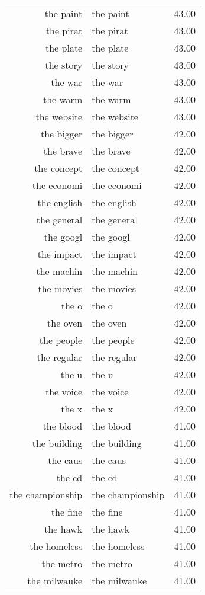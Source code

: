 \begin{table}[ht]
\begin{tabular}{rlr}
  the paint & the paint & 43.00 \\ 
  the pirat & the pirat & 43.00 \\ 
  the plate & the plate & 43.00 \\ 
  the story & the story & 43.00 \\ 
  the war & the war & 43.00 \\ 
  the warm & the warm & 43.00 \\ 
  the website & the website & 43.00 \\ 
  the bigger & the bigger & 42.00 \\ 
  the brave & the brave & 42.00 \\ 
  the concept & the concept & 42.00 \\ 
  the economi & the economi & 42.00 \\ 
  the english & the english & 42.00 \\ 
  the general & the general & 42.00 \\ 
  the googl & the googl & 42.00 \\ 
  the impact & the impact & 42.00 \\ 
  the machin & the machin & 42.00 \\ 
  the movies & the movies & 42.00 \\ 
  the o & the o & 42.00 \\ 
  the oven & the oven & 42.00 \\ 
  the people & the people & 42.00 \\ 
  the regular & the regular & 42.00 \\ 
  the u & the u & 42.00 \\ 
  the voice & the voice & 42.00 \\ 
  the x & the x & 42.00 \\ 
  the blood & the blood & 41.00 \\ 
  the building & the building & 41.00 \\ 
  the caus & the caus & 41.00 \\ 
  the cd & the cd & 41.00 \\ 
  the championship & the championship & 41.00 \\ 
  the fine & the fine & 41.00 \\ 
  the hawk & the hawk & 41.00 \\ 
  the homeless & the homeless & 41.00 \\ 
  the metro & the metro & 41.00 \\ 
  the milwauke & the milwauke & 41.00 \\ 

\end{tabular}
\end{table}
